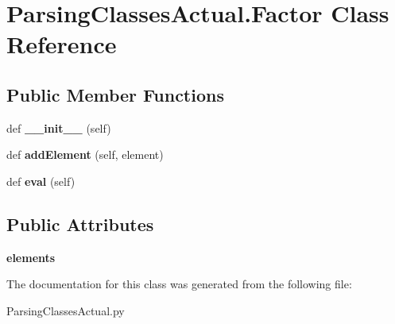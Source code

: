 \hypertarget{class_parsing_classes_actual_1_1_factor}{}\section{Parsing\+Classes\+Actual.\+Factor Class Reference}
\label{class_parsing_classes_actual_1_1_factor}
\subsection*{Public Member Functions}
\begin{DoxyCompactItemize}
\item 
def {\bfseries \+\_\+\+\_\+init\+\_\+\+\_\+} (self)\hypertarget{class_parsing_classes_actual_1_1_factor_ad0bf99ed1dc466e9994adbca9f507d55}{}\label{class_parsing_classes_actual_1_1_factor_ad0bf99ed1dc466e9994adbca9f507d55}

\item 
def {\bfseries add\+Element} (self, element)\hypertarget{class_parsing_classes_actual_1_1_factor_a6dfb419731bf782dd7361c66a783df0d}{}\label{class_parsing_classes_actual_1_1_factor_a6dfb419731bf782dd7361c66a783df0d}

\item 
def {\bfseries eval} (self)\hypertarget{class_parsing_classes_actual_1_1_factor_a7c0779ac99786001a11b9a0ae6db5896}{}\label{class_parsing_classes_actual_1_1_factor_a7c0779ac99786001a11b9a0ae6db5896}

\end{DoxyCompactItemize}
\subsection*{Public Attributes}
\begin{DoxyCompactItemize}
\item 
{\bfseries elements}\hypertarget{class_parsing_classes_actual_1_1_factor_a0e252f30c9cc0e8016d765a1ee7028b4}{}\label{class_parsing_classes_actual_1_1_factor_a0e252f30c9cc0e8016d765a1ee7028b4}

\end{DoxyCompactItemize}


The documentation for this class was generated from the following file\+:\begin{DoxyCompactItemize}
\item 
Parsing\+Classes\+Actual.\+py\end{DoxyCompactItemize}
